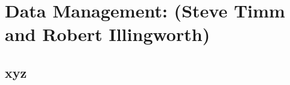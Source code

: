 \chapter{Data Management: (Steve Timm and Robert Illingworth) }
\label{ch:datamgmt}

\section{xyz}
\label{sec:datamgmt:xyz}  %


